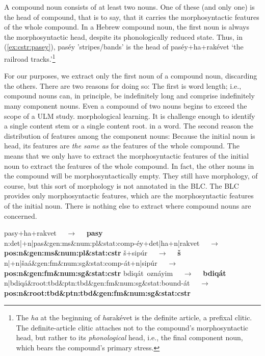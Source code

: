 A compound noun consists of at least two nouns. One of these 
(and only one) is the head of compound, that is to say, that it carries 
the morphosyntactic features of the whole compound. In a Hebrew compound 
noun, the first noun
is always the morphosyntactic head, despite its phonologically 
reduced state.
Thus, in (\ref{ex:cstr:pasey}), \textsf{pas\'{e}y} 'stripes/bands' 
is the head of \textsf{pas\'{e}y+ha+rak\'{e}vet} `the railroad 
tracks.'\footnote{The \textit{ha} at the beginning of  
\textsf{\textit{ha}rak\'{e}vet} is the definite article, a prefixal 
clitic. The definite-article clitic attaches not to the compound's 
morphosyntactic head, but rather to its \emph{phonological} head, 
i.e., the final component noun, which bears the compound's primary stress.}

For our purposes, we extract only the first noun of a compound noun, 
discarding the others. 
There are two reasons for doing so:
The first is word length; 
i.e., compound nouns can, in principle, be indefinitely long and comprise
indefinitely many component nouns.
Even a compound of two nouns begins to exceed the scope 
of a ULM study. morphological learning. It is challenge enough 
to identify a single 
content stem or a single content root.  in a word. 
The second reason the distribution of features among the 
component nouns: Because the initial noun is head, its 
features are \emph{the same as} the features of the whole compound. 
The means that we only have to extract the morphosyntactic 
features of the initial noun to extract the features of the whole 
compound. In fact, the other nouns in the compound will be 
morphosyntactically empty. They still have morphology, of course, 
but this sort of morphology is not annotated in 
the \ac{BLC}. The \ac{BLC} provides only morphosyntactic 
features, which are the morphosyntactic features of the initial 
noun. There is nothing else to extract where compound nouns 
are concerned.

\begin{exe}
\ex \label{ex:cstr:pasey2}
	\textsf{pasy+ha+rakvet} $\quad\to\quad$ 
	\textbf{\textsf{pasy}} \\
	\textsf{n:det|+n|pas\&gen:ms\&num:pl\&stat:comp-\'{e}y+det|ha+n|rakvet} $\quad\to\quad$ \\
	\textbf{\textsf{pos:n\&gen:ms\&num:pl\&stat:cstr}}
\ex \label{ex:cstr:shaat2} 
	\textsf{\v{s}+sip\'{u}r} $\quad\to\quad$ \textbf{\textsf{\v{s}}}\\
	\textsf{n|+n|\v{s}a\'a\&gen:fm\&num:sg\&stat:comp-\'at+n|sip\'ur} $\quad\to\quad$ \\
	\textbf{\textsf{pos:n\&gen:fm\&num:sg\&stat:cstr}}
\ex \label{ex:cstr:bdiqat2} 
	\textsf{bdiq\'{a}t\, ozn\'{a}yim} $\quad\to\quad$ \textbf{\textsf{\textsf{bdiq\'{a}t}}} \\ 
	\textsf{n|bdiq\'{a}\&root:tbd\&ptn:tbd\&gen:fm\&num:sg\&stat:bound-\'{a}t} $\quad\to\quad$ \\
	\textbf{\textsf{pos:n\&root:tbd\&ptn:tbd\&gen:fm\&num:sg\&stat:cstr}}
\end{exe}

